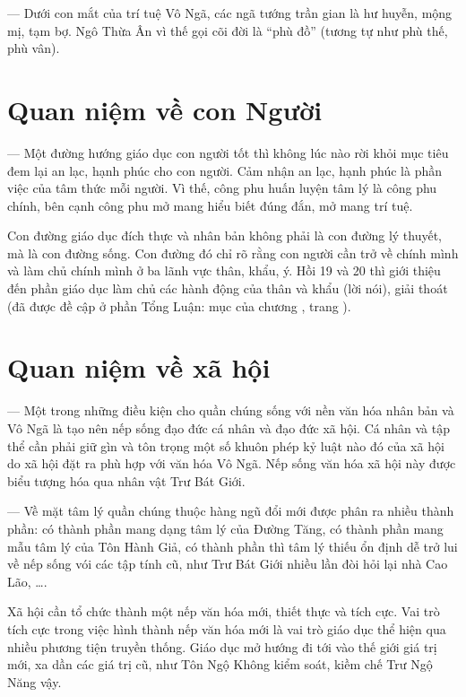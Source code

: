 — Dưới con mắt của trí tuệ Vô Ngã, các ngã tướng trần gian là hư huyễn, mộng mị, tạm bợ. Ngô Thừa Ân vì thế gọi cõi đời là ``phù đồ'' (tương tự như phù thế, phù vân).

\section{Quan niệm về con Người} %
\label{sec:18_19_con_nguoi}

— Một đường hướng giáo dục con người tốt thì không lúc nào rời khỏi mục tiêu đem lại an lạc, hạnh phúc cho con người. Cảm nhận an lạc, hạnh phúc là phần việc của tâm thức mỗi người. Vì thế, công phu huấn luyện tâm lý là công phu chính, bên cạnh công phu mở mang hiểu biết đúng đắn, mở mang trí tuệ.

Con đường giáo dục đích thực và nhân bản không phải là con đường lý thuyết, mà là con đường sống. Con đường đó chỉ rõ rằng con người cần trở về chính mình và làm chủ chính mình ở ba lãnh vực thân, khẩu, ý. Hồi 19 và 20 thì giới thiệu đến phần giáo dục làm chủ các hành động của thân và khẩu (lời nói), giải thoát (đã được đề cập ở phần Tổng Luận: mục  của chương , trang \pageref{sec:qua_cac_nhan_vat_chinh}).

\section{Quan niệm về xã hội} %
\label{sec:18_19_xa_hoi}

— Một trong những điều kiện cho quần chúng sống với nền văn hóa nhân bản và Vô Ngã là tạo nên nếp sống đạo đức cá nhân và đạo đức xã hội. Cá nhân và tập thể cần phải giữ gìn và tôn trọng một số khuôn phép kỷ luật nào đó của xã hội do xã hội đặt ra phù hợp với văn hóa Vô Ngã. Nếp sống văn hóa xã hội này được biểu tượng hóa qua nhân vật Trư Bát Giới.

— Về mặt tâm lý quần chúng thuộc hàng ngũ đổi mới được phân ra nhiều thành phần: có thành phần mang dạng tâm lý của Đường Tăng, có thành phần mang mẫu tâm lý của Tôn Hành Giả, có thành phần thì tâm lý thiếu ổn định dễ trở lui về nếp sống vói các tập tính cũ, như Trư Bát Giới nhiều lần đòi hỏi lại nhà Cao Lão, \ldots.

Xã hội cần tổ chức thành một nếp văn hóa mới, thiết thực và tích cực. Vai trò tích cực trong việc hình thành nếp văn hóa mới là vai trò giáo dục thể hiện qua nhiều phương tiện truyền thống. Giáo dục mở hướng đi tới vào thế giới giá trị mới, xa dần các giá trị cũ, như Tôn Ngộ Không kiểm soát, kiềm chế Trư Ngộ Năng vậy.

